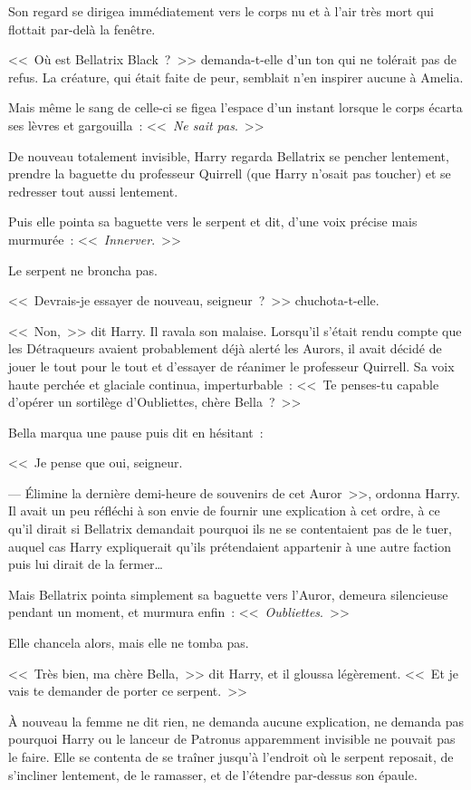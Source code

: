 Son regard se dirigea immédiatement vers le corps nu et à l'air très mort qui flottait par-delà la fenêtre.

<<~Où est Bellatrix Black~?~>> demanda-t-elle d'un ton qui ne tolérait pas de refus. La créature, qui était faite de peur, semblait n'en inspirer aucune à Amelia.

Mais même le sang de celle-ci se figea l'espace d'un instant lorsque le corps écarta ses lèvres et gargouilla~: <<~\emph{Ne sait pas}.~>>

\later

De nouveau totalement invisible, Harry regarda Bellatrix se pencher lentement, prendre la baguette du professeur Quirrell (que Harry n'osait pas toucher) et se redresser tout aussi lentement.

Puis elle pointa sa baguette vers le serpent et dit, d'une voix précise mais murmurée~: <<~\emph{Innerver}.~>>

Le serpent ne broncha pas.

<<~Devrais-je essayer de nouveau, seigneur~?~>> chuchota-t-elle.

<<~Non,~>> dit Harry. Il ravala son malaise. Lorsqu'il s'était rendu compte que les Détraqueurs avaient probablement déjà alerté les Aurors, il avait décidé de jouer le tout pour le tout et d'essayer de réanimer le professeur Quirrell. Sa voix haute perchée et glaciale continua, imperturbable~: <<~Te penses-tu capable d'opérer un sortilège d'Oubliettes, chère Bella~?~>>

Bella marqua une pause puis dit en hésitant~:

<<~Je pense que oui, seigneur.

--- Élimine la dernière demi-heure de souvenirs de cet Auror~>>, ordonna Harry. Il avait un peu réfléchi à son envie de fournir une explication à cet ordre, à ce qu'il dirait si Bellatrix demandait pourquoi ils ne se contentaient pas de le tuer, auquel cas Harry expliquerait qu'ils prétendaient appartenir à une autre faction puis lui dirait de la fermer…

Mais Bellatrix pointa simplement sa baguette vers l'Auror, demeura silencieuse pendant un moment, et murmura enfin~: <<~\emph{Oubliettes}.~>>

Elle chancela alors, mais elle ne tomba pas.

<<~Très bien, ma chère Bella,~>> dit Harry, et il gloussa légèrement. <<~Et je vais te demander de porter ce serpent.~>>

À nouveau la femme ne dit rien, ne demanda aucune explication, ne demanda pas pourquoi Harry ou le lanceur de Patronus apparemment invisible ne pouvait pas le faire. Elle se contenta de se traîner jusqu'à l'endroit où le serpent reposait, de s'incliner lentement, de le ramasser, et de l'étendre par-dessus son épaule.

